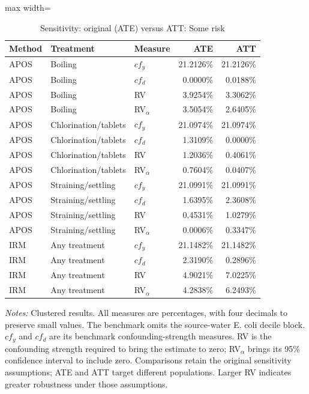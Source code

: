 \begin{table}[htbp]
\centering\scriptsize
\caption{Sensitivity: original (ATE) versus ATT: Some risk}
\label{tab:table-ate-att-sensitivity-SomeRiskHome}
\begin{adjustbox}{max width=\linewidth}
\begin{tabular}{lllrr}
\toprule
Method & Treatment & Measure & ATE & ATT \\
\midrule
APOS & Boiling & $cf_y$ & 21.2126\% & 21.2126\% \\
APOS & Boiling & $cf_d$ & 0.0000\% & 0.0188\% \\
APOS & Boiling & RV & 3.9254\% & 3.3062\% \\
APOS & Boiling & RV$_\alpha$ & 3.5054\% & 2.6405\% \\
APOS & Chlorination/tablets & $cf_y$ & 21.0974\% & 21.0974\% \\
APOS & Chlorination/tablets & $cf_d$ & 1.3109\% & 0.0000\% \\
APOS & Chlorination/tablets & RV & 1.2036\% & 0.4061\% \\
APOS & Chlorination/tablets & RV$_\alpha$ & 0.7604\% & 0.0407\% \\
APOS & Straining/settling & $cf_y$ & 21.0991\% & 21.0991\% \\
APOS & Straining/settling & $cf_d$ & 1.6395\% & 2.3608\% \\
APOS & Straining/settling & RV & 0.4531\% & 1.0279\% \\
APOS & Straining/settling & RV$_\alpha$ & 0.0006\% & 0.3347\% \\
IRM & Any treatment & $cf_y$ & 21.1482\% & 21.1482\% \\
IRM & Any treatment & $cf_d$ & 2.3190\% & 0.2896\% \\
IRM & Any treatment & RV & 4.9021\% & 7.0225\% \\
IRM & Any treatment & RV$_\alpha$ & 4.2838\% & 6.2493\% \\
\bottomrule
\end{tabular}
\end{adjustbox}
\par\vspace{3pt}\begin{minipage}{\linewidth}\scriptsize\textit{Notes:} Clustered results. All measures are percentages, with four decimals to preserve small values. The benchmark omits the source-water E. coli decile block. $cf_y$ and $cf_d$ are its benchmark confounding-strength measures. RV is the confounding strength required to bring the estimate to zero; RV$_\alpha$ brings its 95\% confidence interval to include zero. Comparisons retain the original sensitivity assumptions; ATE and ATT target different populations. Larger RV indicates greater robustness under those assumptions.\end{minipage}
\end{table}
